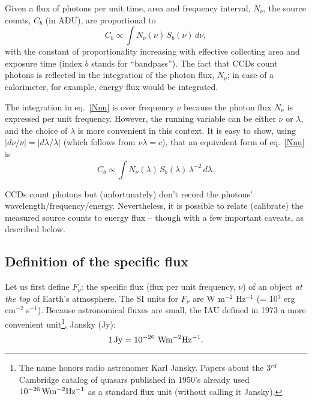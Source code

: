 \documentclass{emulateapj}
\begin{document}
Given a flux of photons per unit time, area and frequency interval, $N_\nu$, the 
source counts, $C_b$ (in ADU), are proportional to 
\begin{equation}
\label{Nnu}
        C_b \propto \int N_\nu(\nu) \, S_b(\nu) \, d\nu,
\end{equation}
with the constant of proportionality increasing with effective collecting area and exposure 
time (index $b$ stands for ``bandpass''). The fact that CCDs count photons is reflected in
the integration of the photon flux, $N_\nu$; in case of a calorimeter, for example, energy 
flux would be integrated.
 
The integration in eq.~\ref{Nnu} is over frequency $\nu$ because the photon flux $N_\nu$ 
is expressed per unit frequency. However, the running variable can be either  $\nu$ or 
$\lambda$, and the choice of $\lambda$ is more convenient in this context. It is 
easy to show, using $|d\nu/\nu| = |d\lambda / \lambda|$ (which follows from $\nu \lambda=c$),
that an equivalent form of  eq.~\ref{Nnu} is
\begin{equation}
\label{Nnu2}
         C_b\propto \int N_\nu(\lambda) \, S_b(\lambda) \, \lambda^{-2} \, d\lambda. 
\end{equation}


CCDs count photons but (unfortunately) don't record the photons' wavelength/frequency/energy.
Nevertheless, it is possible to relate (calibrate) the measured source counts to energy flux -- though
with a few important caveats, as described below. 

 

\subsection{Definition of the specific flux} 

Let us first  define $F_\nu$: the specific flux (flux per unit frequency, $\nu$) of an 
object {\it at the top} of Earth's atmosphere. The SI units for $F_\nu$ are 
W m$^{-2}$ Hz$^{-1}$ (= 10$^{3}$ erg cm$^{-2}$ s$^{-1}$). Because astronomical 
fluxes are small, the IAU defined in 1973 a more convenient unit\footnote{The
name honors radio astronomer Karl Jansky. Papers about the 3$^{rd}$ Cambridge 
catalog of quasars published in 1950's already used $10^{-26} \, {\rm W m^{-2} Hz^{-1}}$
as a standard flux unit (without calling it Jansky).},  Jansky (Jy): 
\begin{equation}
            1 \, {\rm Jy} = 10^{-26} \,\, {\rm W m^{-2} Hz^{-1}}.
\end{equation} 
\end{document}
